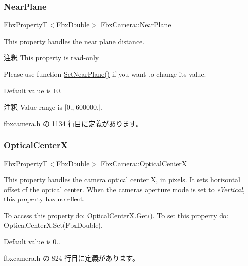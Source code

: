 \subsubsection{\texorpdfstring{Near\+Plane}{NearPlane}}
{\footnotesize\ttfamily \hyperlink{class_fbx_property_t}{Fbx\+PropertyT}$<$\hyperlink{fbxtypes_8h_a171e72a1c46fc15c1a6c9c31948c1c5b}{Fbx\+Double}$>$ Fbx\+Camera\+::\+Near\+Plane}

This property handles the near plane distance.

\begin{DoxyRemark}{注釈}
This property is read-\/only. 

Please use function \hyperlink{class_fbx_camera_a4ceb2775d2392c380cd8529d78f98c7f}{Set\+Near\+Plane()} if you want to change its value.
\end{DoxyRemark}
Default value is 10. \begin{DoxyRemark}{注釈}
Value range is \mbox{[}0., 600000.\mbox{]}. 
\end{DoxyRemark}


 fbxcamera.\+h の 1134 行目に定義があります。

\mbox{\label{class_fbx_camera_af1e8cb54a4d9a16471c6fd56d30cd128}} 
\subsubsection{\texorpdfstring{Optical\+CenterX}{OpticalCenterX}}
{\footnotesize\ttfamily \hyperlink{class_fbx_property_t}{Fbx\+PropertyT}$<$\hyperlink{fbxtypes_8h_a171e72a1c46fc15c1a6c9c31948c1c5b}{Fbx\+Double}$>$ Fbx\+Camera\+::\+Optical\+CenterX}

This property handles the camera optical center X, in pixels. It sets horizontal offset of the optical center. When the camera\textquotesingle{}s aperture mode is set to {\itshape e\+Vertical}, this property has no effect.

To access this property do\+: Optical\+Center\+X.\+Get(). To set this property do\+: Optical\+Center\+X.\+Set(\+Fbx\+Double).

Default value is 0.. 

 fbxcamera.\+h の 824 行目に定義があります。

\mbox{\label{class_fbx_camera_a8154f4f4e907c094df2decb36e179d85}} 
